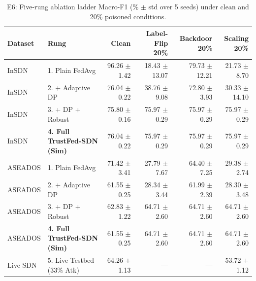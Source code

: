 \begin{table}[t]
\centering
\caption{E6: Five-rung ablation ladder Macro-F1 (\% $\pm$ std over 5 seeds) under clean and 20\% poisoned conditions.}
\label{tab:e6_ablation}
\begin{tabular}{llrrrr}
\toprule
Dataset & Rung & Clean & Label-Flip 20\% & Backdoor 20\% & Scaling 20\% \\
\midrule
InSDN & 1. Plain FedAvg & 96.26 $\pm$ 1.42 & 18.43 $\pm$ 13.07 & 79.73 $\pm$ 12.21 & 21.73 $\pm$ 8.70 \\
InSDN & 2. + Adaptive DP & 76.04 $\pm$ 0.22 & 38.76 $\pm$ 9.08 & 72.80 $\pm$ 3.93 & 30.33 $\pm$ 14.10 \\
InSDN & 3. + DP + Robust & 75.80 $\pm$ 0.16 & 75.97 $\pm$ 0.29 & 75.97 $\pm$ 0.29 & 75.97 $\pm$ 0.29 \\
InSDN & \textbf{4. Full TrustFed-SDN (Sim)} & 76.04 $\pm$ 0.22 & 75.97 $\pm$ 0.29 & 75.97 $\pm$ 0.29 & 75.97 $\pm$ 0.29 \\
\midrule
ASEADOS & 1. Plain FedAvg & 71.42 $\pm$ 3.41 & 27.79 $\pm$ 7.67 & 64.40 $\pm$ 7.25 & 29.38 $\pm$ 2.74 \\
ASEADOS & 2. + Adaptive DP & 61.55 $\pm$ 0.25 & 28.34 $\pm$ 3.44 & 61.99 $\pm$ 2.39 & 28.30 $\pm$ 3.48 \\
ASEADOS & 3. + DP + Robust & 62.83 $\pm$ 1.22 & 64.71 $\pm$ 2.60 & 64.71 $\pm$ 2.60 & 64.71 $\pm$ 2.60 \\
ASEADOS & \textbf{4. Full TrustFed-SDN (Sim)} & 61.55 $\pm$ 0.25 & 64.71 $\pm$ 2.60 & 64.71 $\pm$ 2.60 & 64.71 $\pm$ 2.60 \\
\midrule
Live SDN & 5. Live Testbed (33\% Atk) & 64.26 $\pm$ 1.13 & --- & --- & 53.72 $\pm$ 1.12 \\
\bottomrule
\end{tabular}
\end{table}
